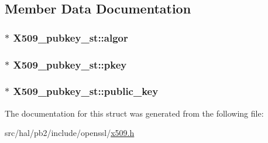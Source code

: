 \subsection{Member Data Documentation}
\subsubsection[{\texorpdfstring{algor}{algor}}]{$\ast$ X509\+\_\+pubkey\+\_\+st\+::algor}\hypertarget{struct_x509__pubkey__st_a0fb9c56d9396c7fffdb67e9c758be102}{}\label{struct_x509__pubkey__st_a0fb9c56d9396c7fffdb67e9c758be102}
\subsubsection[{\texorpdfstring{pkey}{pkey}}]{$\ast$ X509\+\_\+pubkey\+\_\+st\+::pkey}\hypertarget{struct_x509__pubkey__st_a3ffae0e6f6a9c34c52339de00d8a8234}{}\label{struct_x509__pubkey__st_a3ffae0e6f6a9c34c52339de00d8a8234}
\subsubsection[{\texorpdfstring{public\+\_\+key}{public_key}}]{$\ast$ X509\+\_\+pubkey\+\_\+st\+::public\+\_\+key}\hypertarget{struct_x509__pubkey__st_ae2fae3c3fa6b2d0a28b5873da1361250}{}\label{struct_x509__pubkey__st_ae2fae3c3fa6b2d0a28b5873da1361250}


The documentation for this struct was generated from the following file\+:\begin{DoxyCompactItemize}
\item 
src/hal/pb2/include/openssl/\hyperlink{x509_8h}{x509.\+h}\end{DoxyCompactItemize}
